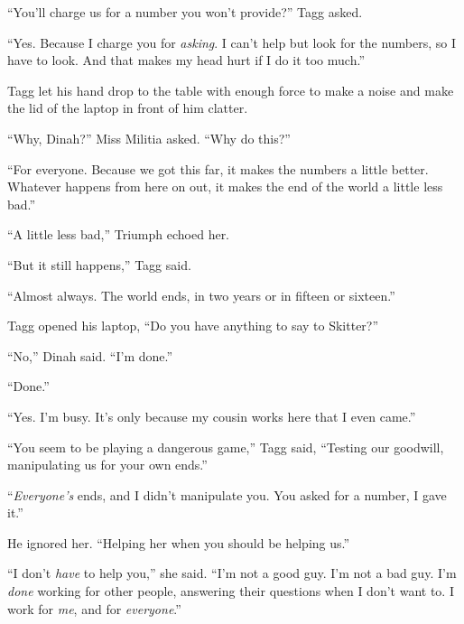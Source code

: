 ``You'll charge us for a number you won't provide?''  Tagg asked.



``Yes.  Because I charge you for \emph{asking}.  I can't help but look for the numbers, so I have to look.  And that makes my head hurt if I do it too much.''



Tagg let his hand drop to the table with enough force to make a noise and make the lid of the laptop in front of him clatter.



``Why, Dinah?'' Miss Militia asked.  ``Why do this?''



``For everyone.  Because we got this far, it makes the numbers a little better.  Whatever happens from here on out, it makes the end of the world a little less bad.''



``A little less bad,'' Triumph echoed her.



``But it still happens,'' Tagg said.



``Almost always.  The world ends, in two years or in fifteen or sixteen.''



Tagg opened his laptop, ``Do you have anything to say to Skitter?''



``No,'' Dinah said.  ``I'm done.''



``Done.''



``Yes.  I'm busy.  It's only because my cousin works here that I even came.''



``You seem to be playing a dangerous game,'' Tagg said, ``Testing our goodwill, manipulating us for your own ends.''



``\emph{Everyone's} ends, and I didn't manipulate you.  You asked for a number, I gave it.''



He ignored her.  ``Helping her when you should be helping us.''



``I don't \emph{have} to help you,'' she said.  ``I'm not a good guy.  I'm not a bad guy.  I'm \emph{done} working for other people, answering their questions when I don't want to.  I work for \emph{me}, and for \emph{everyone}.''



